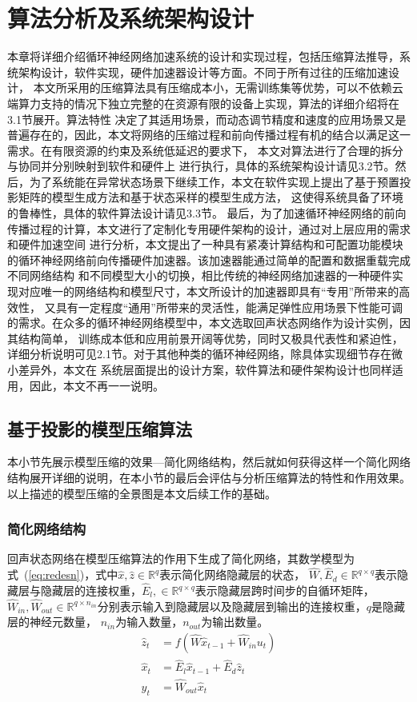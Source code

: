 \chapter{算法分析及系统架构设计}
本章将详细介绍循环神经网络加速系统的设计和实现过程，包括压缩算法推导，系统架构设计，软件实现，硬件加速器设计等方面。不同于所有过往的压缩加速设计，
本文所采用的压缩算法具有压缩成本小，无需训练集等优势，可以不依赖云端算力支持的情况下独立完整的在资源有限的设备上实现，算法的详细介绍将在3.1节展开。算法特性
决定了其适用场景，而动态调节精度和速度的应用场景又是普遍存在的，因此，本文将网络的压缩过程和前向传播过程有机的结合以满足这一需求。在有限资源的约束及系统低延迟的要求下，
本文对算法进行了合理的拆分与协同并分别映射到软件和硬件上
进行执行，具体的系统架构设计请见3.2节。然后，为了系统能在异常状态场景下继续工作，本文在软件实现上提出了基于预置投影矩阵的模型生成方法和基于状态采样的模型生成方法，
这使得系统具备了环境的鲁棒性，具体的软件算法设计请见3.3节。
最后，为了加速循环神经网络的前向传播过程的计算，本文进行了定制化专用硬件架构的设计，通过对上层应用的需求和硬件加速空间
进行分析，本文提出了一种具有紧凑计算结构和可配置功能模块的循环神经网络前向传播硬件加速器。该加速器能通过简单的配置和数据重载完成不同网络结构
和不同模型大小的切换，相比传统的神经网络加速器的一种硬件实现对应唯一的网络结构和模型尺寸，本文所设计的加速器即具有“专用”所带来的高效性，
又具有一定程度“通用”所带来的灵活性，能满足弹性应用场景下性能可调的需求。在众多的循环神经网络模型中，本文选取回声状态网络作为设计实例，因其结构简单，
训练成本低和应用前景开阔等优势，同时又极具代表性和紧迫性，详细分析说明可见2.1节。对于其他种类的循环神经网络，除具体实现细节存在微小差异外，本文在
系统层面提出的设计方案，软件算法和硬件架构设计也同样适用，因此，本文不再一一说明。
\section{基于投影的模型压缩算法}
本小节先展示模型压缩的效果---简化网络结构，然后就如何获得这样一个简化网络结构展开详细的说明，在本小节的最后会评估与分析压缩算法的特性和作用效果。
以上描述的模型压缩的全景图是本文后续工作的基础。
\subsection{简化网络结构}
回声状态网络在模型压缩算法的作用下生成了简化网络，其数学模型为式~(\ref{eq:redesn})，式中\(\widehat{x},\widehat{z} \in \mathbb{R}^q\)表示简化网络隐藏层的状态，
\(\widehat{W}, \widehat{E}_d \in \mathbb{R}^{q \times q}\)表示隐藏层与隐藏层的连接权重，\(\widehat{E}_l,\in \mathbb{R}^{q \times q}\)表示隐藏层跨时间步的自循环矩阵，
\(\widehat{W}_{in},\widehat{W}_{out}\in \mathbb{R}^{q \times n_{in}}\)分别表示输入到隐藏层以及隐藏层到输出的连接权重，\(q\)是隐藏层的神经元数量，
\(n_{in}\)为输入数量，\(n_{out}\)为输出数量。
\begin{equation}\label{eq:redesn}
	\begin{split}
		\widehat{z}_t &= f(\widehat{W}  \widehat{x}_{t-1} + \widehat{W}_{in}  u_{t})				\\	
		\widehat{x}_t &= \widehat{E}_l  \widehat{x}_{t-1} + \widehat{E}_d  \widehat{z}_{t} 		\\
		y_{t} 			&= \widehat{W}_{out}  \widehat{x}_{t}	
	\end{split}
\end{equation}

